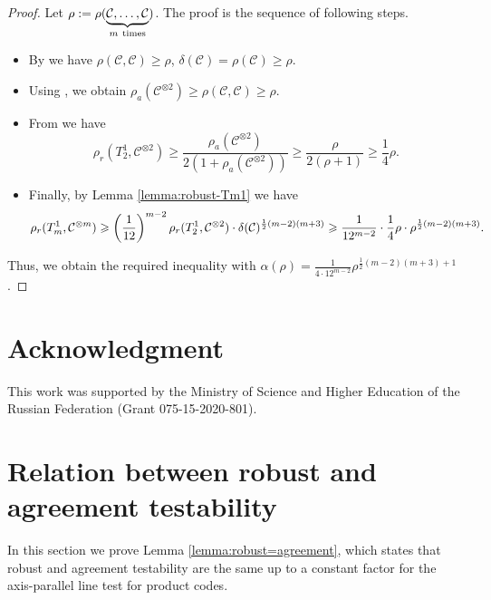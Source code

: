 \documentclass[11pt]{article}
\newcommand{\cC}{\mathcal{C}}
\newcommand{\cCpow}[1]{\cC^{\otimes #1}}
\begin{document}
\MainProp*
\begin{proof}%
    Let $\rho:=\rho(\underbrace{\cC,\ldots,\cC}_{m\ \mbox{\scriptsize\rm times}})$. The proof is the sequence of following steps.
    \begin{itemize}
        \item By \cite[Lemma 11]{PK2022robust} we have $\rho(\cC,\cC)\ge\rho$, $\delta(\cC)=\rho(\cC)\ge\rho$.
        \item Using \cite[Lemma 1]{PK2022robust}, we obtain $\rho_a(\cCpow{2})\ge\rho(\cC,\cC)\ge\rho$.
        \item From \cite[Lemma 2.9]{Dinur:stoc2022} we have 
        \begin{equation*}
        \rho_r(T_2^1, \cCpow{2})\ge \frac{\rho_a(\cCpow{2})}{2(1+\rho_a(\cCpow{2}))}\ge \frac{\rho}{2(\rho+1)}\ge\frac14\rho.    
        \end{equation*}
        \item Finally, by Lemma \ref{lemma:robust-Tm1} we have \[
        \rho_r(T_m^1,\cCpow{m})\ge\rbr{\frac1{12}}^{m-2}\rho_r(T_2^1,\cCpow{2})\cdot\delta(\cC)^{\frac12(m-2)(m+3)}\ge \frac{1}{12^{m-2}}\cdot\frac{1}{4}\rho\cdot \rho^{\frac12(m-2)(m+3)}.
        \]
    \end{itemize}
    Thus, we obtain the required inequality with $\alpha(\rho)=\frac{1}{4\cdot 12^{m-2}}\rho^{\frac12(m-2)(m+3)+1}$.
\end{proof}

\section*{Acknowledgment}

This work was supported by the Ministry of Science and Higher Education of the Russian Federation (Grant 075-15-2020-801).




\appendix

\section{Relation between robust and agreement testability}\label{app:robust=agreement}
In this section we prove Lemma \ref{lemma:robust=agreement}, which states that robust and agreement testability are the same up to a constant factor for the axis-parallel line test for product codes.
\end{document}
